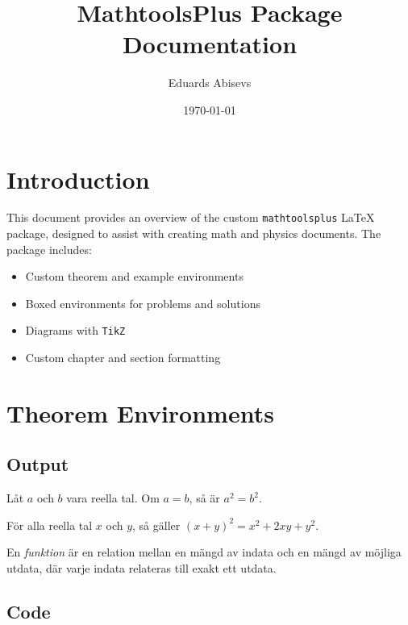 \documentclass[swedish]{article}
\title{MathtoolsPlus Package Documentation}
\author{Eduards Abisevs}
\date{\today}
\begin{document}
\maketitle
\tableofcontents

\section{Introduction}
This document provides an overview of the custom \texttt{mathtoolsplus} LaTeX package, designed to assist with creating math and physics documents. The package includes:
\begin{itemize}
    \item Custom theorem and example environments
    \item Boxed environments for problems and solutions
    \item Diagrams with \texttt{TikZ}
    \item Custom chapter and section formatting
\end{itemize}

\section{Theorem Environments}

\subsection{Output}

\begin{theorem}
Låt \( a \) och \( b \) vara reella tal. Om \( a = b \), så är \( a^2 = b^2 \).
\end{theorem}

\begin{lemma}
För alla reella tal \( x \) och \( y \), 
så gäller \( (x + y)^2 = x^2 + 2xy + y^2 \).
\end{lemma}

\begin{definition}
En \textit{funktion} är en relation mellan en mängd av indata och en mängd av möjliga utdata, där varje indata relateras till exakt ett utdata.
\end{definition}

\subsection{Code}
\end{document}
